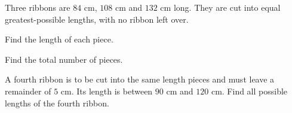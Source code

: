  Three ribbons are $84$ cm, $108$ cm and $132$ cm long. They are cut into equal greatest-possible lengths, with no ribbon left over.
\begin{subparts}
  \item Find the length of each piece.
  \item Find the total number of pieces.
  \item A fourth ribbon is to be cut into the same length pieces and must leave a remainder of $5$ cm. Its length is between $90$ cm and $120$ cm. Find all possible lengths of the fourth ribbon.
\end{subparts}
